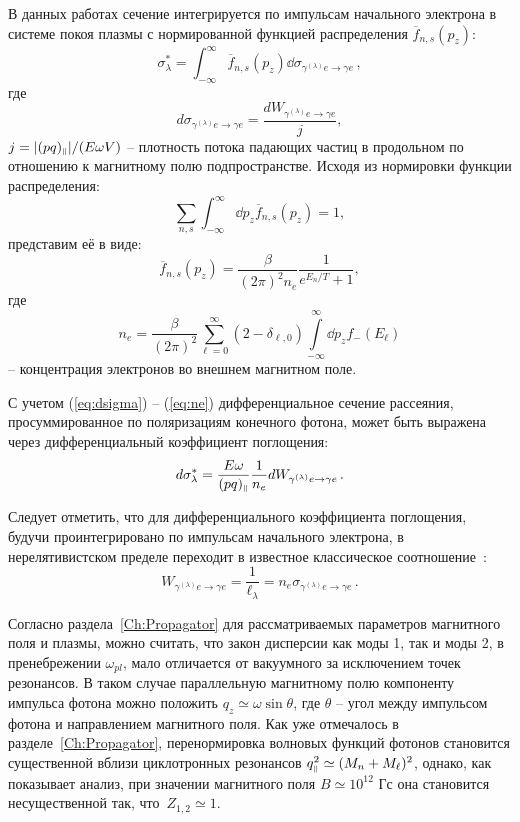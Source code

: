 В данных работах сечение интегрируется по импульсам начального 
электрона в системе покоя плазмы
с нормированной функцией распределения $\overline{f}_{n,s}(p_z)$:
\begin{equation}\label{eq:dsigma}
	\sigma^*_\lambda=\int_{-\infty}^{\infty} 
	\overline{f}_{n,s}(p_z)\dd\sigma_{\gamma^{(\lambda)} e\to \gamma e}\, ,
\end{equation}
где 
\begin{equation}
	d\sigma_{\gamma^{(\lambda)} e\to \gamma e}= \frac{dW_{\gamma^{(\lambda)} e \to \gamma e}}{j},
\end{equation}
$j=|(pq)_{\mbox{\tiny $\|$}}|/(E \omega V)$ -- плотность потока падающих 
частиц  в продольном по отношению к магнитному полю подпространстве. Исходя из 
нормировки функции распределения:
\begin{equation}
	\sum_{n,s}\int_{-\infty}^{\infty} \dd p_z \overline{f}_{n,s}(p_z)=1,
\end{equation}
представим её в виде:
\begin{equation}
	\overline{f}_{n,s}(p_z)=\frac{\beta}{(2\pi)^2n_e}\frac{1}{e^{E_n/T}+1},
\end{equation}
где 
\begin{equation}\label{eq:ne}
	n_e = \frac{\beta}{(2 \pi)^2} \sum \limits^{\infty}_{\ell=0} 
	(2-\delta_{\ell,0}) \int \limits^{\infty}_{-\infty}\dd p_z f_{-}(E_{\ell})
\end{equation}
-- концентрация электронов во внешнем магнитном поле.

С учетом (\ref{eq:dsigma}) -- (\ref{eq:ne}) дифференциальное сечение рассеяния, просуммированное по 
поляризациям конечного фотона, может быть выражена через дифференциальный 
коэффициент поглощения:
\begin{equation}
	d\sigma^*_\lambda=\frac{E\omega}{(pq)_{\mbox{\tiny $\|$}}}\frac{1}{n_e} 
	dW_{\gamma^{(\lambda)} e\to\gamma e}\, .
\end{equation}

Следует отметить, что для дифференциального коэффициента поглощения, будучи 
проинтегрировано по импульсам 
начального 
электрона, в 
нерелятивистском пределе переходит в известное классическое соотношение~\cite{Landau:1989}:
\begin{equation}
W_{\gamma^{(\lambda)} e\to\gamma e}=\frac{1}{\ell_\lambda}=n_e 
\sigma_{\gamma^{(\lambda)} e\to\gamma e}\, .
\end{equation}


Согласно раздела~\ref{Ch:Propagator} для рассматриваемых параметров магнитного поля и плазмы, можно считать, что закон дисперсии как моды 1, так и моды 2, в пренебрежении $\omega_{pl}$, мало отличается от вакуумного за исключением точек резонансов. В таком случае параллельную магнитному полю компоненту импульса фотона можно положить
$q_z \simeq \omega \sin{\theta}$, где 
$\theta$ -- угол между импульсом фотона и направлением магнитного поля. Как уже отмечалось в разделе~\ref{Ch:Propagator}, перенормировка волновых функций фотонов становится существенной вблизи циклотронных резонансов $q^2_{\mbox{\tiny $\|$}} \simeq (M_n+M_{\ell})^2$, однако, как показывает анализ, при значении магнитного поля $B\simeq 10^{12}$ Гс она становится несущественной так, что~$Z_{1,2}\simeq 1$. 

